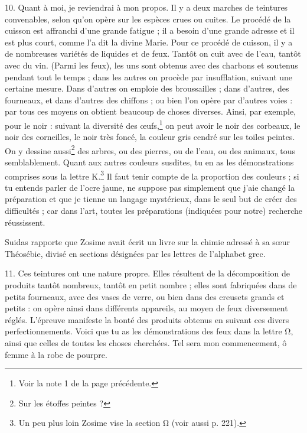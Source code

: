 \documentclass[a4paper, 11pt, oneside, polutonikogreek, french]{article}
\begin{document}
10. Quant à moi, je reviendrai à mon propos. Il y a deux marches de teintures convenables, selon qu'on opère sur les espèces crues ou cuites. Le procédé de la cuisson est affranchi d'une grande fatigue ; il a besoin d'une grande adresse et il est plus court, comme l'a dit la divine Marie. Pour ce procédé de cuisson, il y a de nombreuses variétés de liquides et de feux. Tantôt on cuit avec de l'eau, tantôt avec du vin. (Parmi les feux), les uns sont obtenus avec des charbons et soutenus pendant tout le temps ; dans les autres on procède par insufflation, suivant une certaine mesure. Dans d'autres on emploie des broussailles ; dans d'autres, des fourneaux, et dans d'autres des chiffons ; ou bien l'on opère par d'autres voies : par tous ces moyens on obtient beaucoup de choses diverses. Ainsi, par exemple, pour le noir : suivant la diversité des œufs,\footnote{Voir la note 1 de la page précédente.} on peut avoir le noir des corbeaux, le noir des corneilles, le noir très foncé, la couleur gris cendré sur les toiles peintes. On y dessine aussi\footnote{Sur les étoffes peintes ?} des arbres, ou des pierres, ou de l'eau, ou des animaux, tous semblablement. Quant aux autres couleurs susdites, tu en as les démonstrations comprises sous la lettre K.\footnote{Un peu plus loin Zosime vise la section Ω (voir aussi p. 221).  } Il faut tenir compte de la proportion des couleurs ; si tu entends parler de l'ocre jaune, ne suppose pas simplement que j'aie changé la préparation et que je tienne un langage mystérieux, dans le seul but de créer des difficultés ; car dans l'art, toutes les préparations (indiquées pour notre) recherche réussissent.

Suidas rapporte que Zosime avait écrit un livre sur la chimie adressé à sa sœur Théosébie, divisé en sections désignées par les lettres de l'alphabet grec.

11. Ces teintures ont une nature propre. Elles résultent de la décomposition de produits tantôt nombreux, tantôt en petit nombre ; elles sont fabriquées dans de petits fourneaux, avec des vases de verre, ou bien dans des creusets grands et petits : on opère ainsi dans différents appareils, au moyen de feux diversement réglés. L'épreuve manifeste la bonté des produits obtenus en suivant ces divers perfectionnements. Voici que tu as les démonstrations des feux dans la lettre Ω, ainsi que celles de toutes les choses cherchées. Tel sera mon commencement, ô femme à la robe de pourpre.

\bigskip
\centerline{\EightStarTaper}
\centerline{\EightStarTaper\EightStarTaper}
\bigskip
\end{document}
